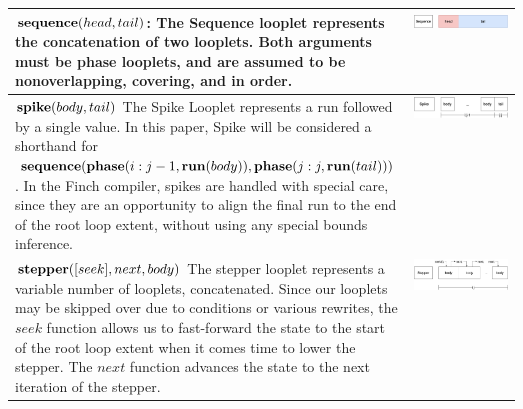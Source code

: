 \begin{figure}[ht]
\begin{tabular} {|p{0.65\linewidth}|c|}
\begin{minipage}[c]{0.65\linewidth}
        $\text{\textbf{sequence}}(head, tail)$: The Sequence looplet represents the concatenation of two looplets. Both arguments must be phase looplets, and are assumed to be nonoverlapping, covering, and in order.
    \end{minipage} &
    \begin{minipage}[c]{0.25\linewidth}
        \centering
        \includegraphics[scale=0.20]{Looplets-sequence.png}
    \end{minipage} \\ \hline
    \begin{minipage}[c]{0.65\linewidth}
        $\text{\textbf{spike}}(body, tail)$ The Spike Looplet represents a run followed by a single value. In this paper, Spike will be considered a shorthand for $\text{\textbf{sequence}}(\text{\textbf{phase}}(i:j-1, \text{\textbf{run}}(body)), \text{\textbf{phase}}(j:j, \text{\textbf{run}}(tail)))$.  In the Finch compiler, spikes are handled with special care, since they are an opportunity to align the final run to the end of the root loop extent, without using any special bounds inference.
    \end{minipage} &
    \begin{minipage}[c]{0.25\linewidth}
        \centering
        \includegraphics[scale=0.20]{Looplets-spike.png}
    \end{minipage} \\ \hline
    \begin{minipage}[c]{0.65\linewidth}
        $\text{\textbf{stepper}}([seek], next, body)$ The stepper looplet represents a variable number of looplets, concatenated. Since our looplets may be skipped over due to conditions or various rewrites, the $seek$ function allows us to fast-forward the state to the start of the root loop extent when it comes time to lower the stepper. The $next$ function advances the state to the next iteration of the stepper. 
    \end{minipage} &
    \begin{minipage}[c]{0.25\linewidth}
        \centering
        \includegraphics[scale=0.20]{Looplets-stepper.png}

\end{minipage}
\end{tabular}
\end{figure}
